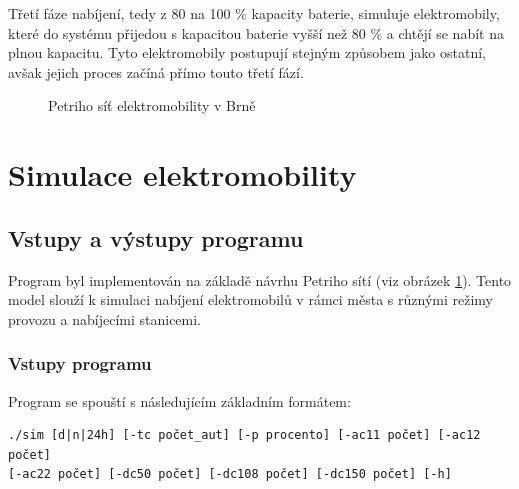 \documentclass[a4paper,11pt]{article}
\begin{document}
Třetí fáze nabíjení, tedy z 80 na 100 \% kapacity baterie, simuluje elektromobily, které do systému přijedou s kapacitou baterie vyšší než 80 \% a chtějí se nabít na plnou kapacitu. Tyto elektromobily postupují stejným způsobem jako ostatní, avšak jejich proces začíná přímo touto třetí fází.


\begin{figure}[H]
    \centering
    \caption{Petriho síť elektromobility v Brně}
    \label{figure:ims-petri-net}
\end{figure}

\section{Simulace elektromobility}

\subsection{Vstupy a výstupy programu}

Program byl implementován na základě návrhu Petriho sítí (viz obrázek \ref{figure:ims-petri-net}). Tento model slouží k simulaci nabíjení elektromobilů v rámci města s různými režimy provozu a nabíjecími stanicemi.

\subsubsection{Vstupy programu}

Program se spouští s následujícím základním formátem:

\begin{verbatim}
./sim [d|n|24h] [-tc počet_aut] [-p procento] [-ac11 počet] [-ac12 počet]
[-ac22 počet] [-dc50 počet] [-dc108 počet] [-dc150 počet] [-h]
\end{verbatim}
\end{document}
